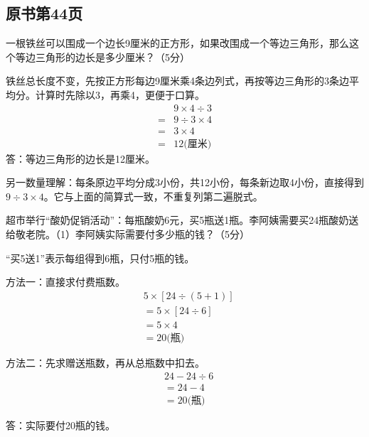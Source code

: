 
\subsection*{原书第44页}

一根铁丝可以围成一个边长9厘米的正方形，如果改围成一个等边三角形，那么这个等边三角形的边长是多少厘米？（5分）\par
\begin{BookAnswer}
铁丝总长度不变，先按正方形每边9厘米乘4条边列式，再按等边三角形的3条边平均分。计算时先除以3，再乘4，更便于口算。\[\begin{aligned}&9\times4\div3\\={}&9\div3\times4\\={}&3\times4\\={}&12\text{(厘米)}\end{aligned}\]答：等边三角形的边长是12厘米。\par 另一数量理解：每条原边平均分成3小份，共12小份，每条新边取4小份，直接得到\(9\div3\times4\)。它与上面的简算式一致，不重复列第二遍脱式。
\end{BookAnswer}

超市举行“酸奶促销活动”：每瓶酸奶6元，买5瓶送1瓶。李阿姨需要买24瓶酸奶送给敬老院。（1）李阿姨实际需要付多少瓶的钱？（5分）\par
\begin{BookAnswer}
“买5送1”表示每组得到6瓶，只付5瓶的钱。\par 方法一：直接求付费瓶数。\[\begin{aligned}&5\times[24\div(5+1)]\\&=5\times[24\div6]\\&=5\times4\\&=20\text{(瓶)}\end{aligned}\]\par 方法二：先求赠送瓶数，再从总瓶数中扣去。\[\begin{aligned}&24-24\div6\\&=24-4\\&=20\text{(瓶)}\end{aligned}\]\par 答：实际要付20瓶的钱。
\end{BookAnswer}

